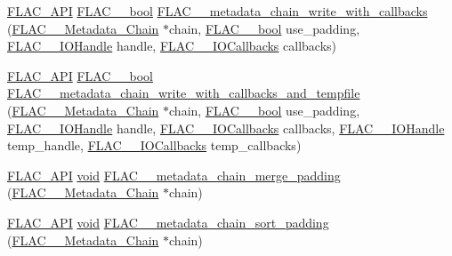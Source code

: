 \begin{DoxyCompactItemize}
\item 
\hyperlink{group__flac__export_ga56ca07df8a23310707732b1c0007d6f5}{F\+L\+A\+C\+\_\+\+A\+PI} \hyperlink{ordinals_8h_a95103469f1cbd78b8cf250194985b34e}{F\+L\+A\+C\+\_\+\+\_\+bool} \hyperlink{group__flac__metadata__level2_ga6bf7552940ec2242718d1ab164b89e03}{F\+L\+A\+C\+\_\+\+\_\+metadata\+\_\+chain\+\_\+write\+\_\+with\+\_\+callbacks} (\hyperlink{group__flac__metadata__level2_gaec6993c60b88f222a52af86f8f47bfdf}{F\+L\+A\+C\+\_\+\+\_\+\+Metadata\+\_\+\+Chain} $\ast$chain, \hyperlink{ordinals_8h_a95103469f1cbd78b8cf250194985b34e}{F\+L\+A\+C\+\_\+\+\_\+bool} use\+\_\+padding, \hyperlink{group__flac__callbacks_ga4c329c3168dee6e352384c5e9306260d}{F\+L\+A\+C\+\_\+\+\_\+\+I\+O\+Handle} handle, \hyperlink{struct_f_l_a_c_____i_o_callbacks}{F\+L\+A\+C\+\_\+\+\_\+\+I\+O\+Callbacks} callbacks)
\item 
\hyperlink{group__flac__export_ga56ca07df8a23310707732b1c0007d6f5}{F\+L\+A\+C\+\_\+\+A\+PI} \hyperlink{ordinals_8h_a95103469f1cbd78b8cf250194985b34e}{F\+L\+A\+C\+\_\+\+\_\+bool} \hyperlink{group__flac__metadata__level2_ga371beab0d09d5248272bcb8d57de94f3}{F\+L\+A\+C\+\_\+\+\_\+metadata\+\_\+chain\+\_\+write\+\_\+with\+\_\+callbacks\+\_\+and\+\_\+tempfile} (\hyperlink{group__flac__metadata__level2_gaec6993c60b88f222a52af86f8f47bfdf}{F\+L\+A\+C\+\_\+\+\_\+\+Metadata\+\_\+\+Chain} $\ast$chain, \hyperlink{ordinals_8h_a95103469f1cbd78b8cf250194985b34e}{F\+L\+A\+C\+\_\+\+\_\+bool} use\+\_\+padding, \hyperlink{group__flac__callbacks_ga4c329c3168dee6e352384c5e9306260d}{F\+L\+A\+C\+\_\+\+\_\+\+I\+O\+Handle} handle, \hyperlink{struct_f_l_a_c_____i_o_callbacks}{F\+L\+A\+C\+\_\+\+\_\+\+I\+O\+Callbacks} callbacks, \hyperlink{group__flac__callbacks_ga4c329c3168dee6e352384c5e9306260d}{F\+L\+A\+C\+\_\+\+\_\+\+I\+O\+Handle} temp\+\_\+handle, \hyperlink{struct_f_l_a_c_____i_o_callbacks}{F\+L\+A\+C\+\_\+\+\_\+\+I\+O\+Callbacks} temp\+\_\+callbacks)
\item 
\hyperlink{group__flac__export_ga56ca07df8a23310707732b1c0007d6f5}{F\+L\+A\+C\+\_\+\+A\+PI} \hyperlink{png_8h_ac9c84fa68bbad002983e35ce3663c686}{void} \hyperlink{group__flac__metadata__level2_gab24934bc1f0e054c631a22c9b9221f3e}{F\+L\+A\+C\+\_\+\+\_\+metadata\+\_\+chain\+\_\+merge\+\_\+padding} (\hyperlink{group__flac__metadata__level2_gaec6993c60b88f222a52af86f8f47bfdf}{F\+L\+A\+C\+\_\+\+\_\+\+Metadata\+\_\+\+Chain} $\ast$chain)
\item 
\hyperlink{group__flac__export_ga56ca07df8a23310707732b1c0007d6f5}{F\+L\+A\+C\+\_\+\+A\+PI} \hyperlink{png_8h_ac9c84fa68bbad002983e35ce3663c686}{void} \hyperlink{group__flac__metadata__level2_gaa14304da1c8e706808cfafa5cbbf575b}{F\+L\+A\+C\+\_\+\+\_\+metadata\+\_\+chain\+\_\+sort\+\_\+padding} (\hyperlink{group__flac__metadata__level2_gaec6993c60b88f222a52af86f8f47bfdf}{F\+L\+A\+C\+\_\+\+\_\+\+Metadata\+\_\+\+Chain} $\ast$chain)

\end{DoxyCompactItemize}
